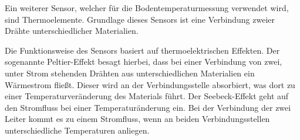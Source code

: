 Ein weiterer Sensor, welcher für die Bodentemperaturmessung verwendet wird,
sind Thermoelemente. Grundlage dieses Sensors ist eine Verbindung zweier Drähte
unterschiedlicher Materialien. 


Die Funktionsweise des Sensors basiert auf
thermoelektrischen Effekten. Der sogenannte Peltier-Effekt besagt hierbei, dass
bei einer Verbindung von zwei, unter Strom stehenden Drähten aus
unterschiedlichen Materialien ein Wärmestrom fließt. Dieser wird an der
Verbindungsstelle absorbiert, was dort zu einer Temperaturveränderung des
Materials führt. Der Seebeck-Effekt geht auf den Stromfluss bei einer
Temperaturänderung ein. Bei der Verbindung der zwei Leiter kommt es zu einem
Stromfluss, wenn an beiden Verbindungsstellen unterschiedliche Temperaturen
anliegen. \cite{bernhard2014thermoelemente}


